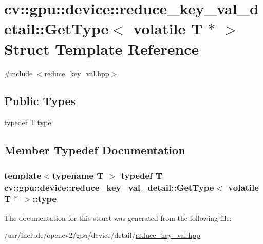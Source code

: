 \hypertarget{structcv_1_1gpu_1_1device_1_1reduce__key__val__detail_1_1GetType_3_01volatile_01T_01_5_01_4}{\section{cv\-:\-:gpu\-:\-:device\-:\-:reduce\-\_\-key\-\_\-val\-\_\-detail\-:\-:Get\-Type$<$ volatile T $\ast$ $>$ Struct Template Reference}
\label{structcv_1_1gpu_1_1device_1_1reduce__key__val__detail_1_1GetType_3_01volatile_01T_01_5_01_4}
}


{\ttfamily \#include $<$reduce\-\_\-key\-\_\-val.\-hpp$>$}

\subsection*{Public Types}
\begin{DoxyCompactItemize}
\item 
typedef \hyperlink{calib3d_8hpp_a3efb9551a871ddd0463079a808916717}{T} \hyperlink{structcv_1_1gpu_1_1device_1_1reduce__key__val__detail_1_1GetType_3_01volatile_01T_01_5_01_4_a982949242fdf5405b6d3dd04083c45b3}{type}
\end{DoxyCompactItemize}


\subsection{Member Typedef Documentation}
\hypertarget{structcv_1_1gpu_1_1device_1_1reduce__key__val__detail_1_1GetType_3_01volatile_01T_01_5_01_4_a982949242fdf5405b6d3dd04083c45b3}{
\subsubsection[{type}]{\setlength{\rightskip}{0pt plus 5cm}template$<$typename T $>$ typedef {\bf T} {\bf cv\-::gpu\-::device\-::reduce\-\_\-key\-\_\-val\-\_\-detail\-::\-Get\-Type}$<$ volatile {\bf T} $\ast$ $>$\-::{\bf type}}}\label{structcv_1_1gpu_1_1device_1_1reduce__key__val__detail_1_1GetType_3_01volatile_01T_01_5_01_4_a982949242fdf5405b6d3dd04083c45b3}


The documentation for this struct was generated from the following file\-:\begin{DoxyCompactItemize}
\item 
/usr/include/opencv2/gpu/device/detail/\hyperlink{reduce__key__val_8hpp}{reduce\-\_\-key\-\_\-val.\-hpp}\end{DoxyCompactItemize}
